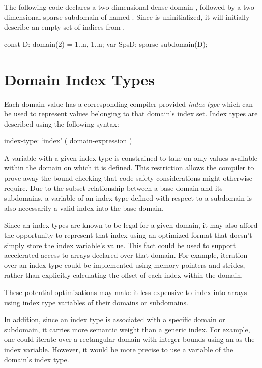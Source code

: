 \begin{example}
The following code declares a two-dimensional dense domain ,
followed by a two dimensional sparse subdomain of 
named .  Since  is uninitialized, it will
initially describe an empty set of indices from .
\begin{chapel}
const D: domain(2) = {1..n, 1..n};
var SpsD: sparse subdomain(D);
\end{chapel}
\end{example}

\section{Domain Index Types}
\label{Index_Types}

Each domain value has a corresponding compiler-provided \emph{index
type} which can be used to represent values belonging to that domain's
index set.  Index types are described using the following syntax:

\begin{syntax}
index-type:
  `index' ( domain-expression )
\end{syntax}

A variable with a given index type is constrained to take on only values
available within the domain on which it is defined.  This restriction allows the
compiler to prove away the bound checking that code safety considerations might
otherwise require.  Due to the subset relationship between a base domain and its
subdomains, a variable of an index type defined with respect to a subdomain is
also necessarily a valid index into the base domain.

Since an index types are known to be legal for a given domain, it may
also afford the opportunity to represent that index using an optimized
format that doesn't simply store the index variable's value.  This fact could be
used to support accelerated access to arrays declared over that domain.  For
example, iteration over an index type could be implemented using memory pointers
and strides, rather than explicitly calculating the offset of each index
within the domain.

These potential optimizations may make it less expensive to
index into arrays using index type variables of their domains or
subdomains.

In addition, since an index type is associated with a specific domain or subdomain, it
carries more semantic weight than a generic index.  For example, one could
iterate over a rectangular domain with integer bounds using an  as
the index variable.  However, it would be more precise to use a variable of the
domain's index type.

